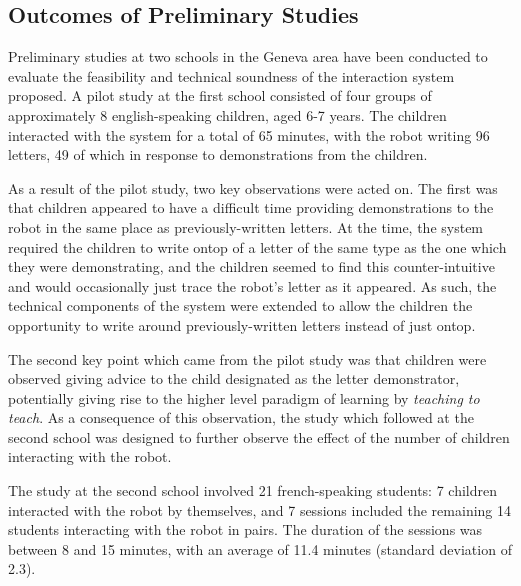 \documentclass{sig-alternate}
\begin{document}
\subsection{Outcomes of Preliminary Studies}%
%
%

Preliminary studies at two schools in the Geneva area have been conducted to
evaluate the feasibility and technical soundness of the interaction system
proposed. A pilot study at the first school consisted of four groups of
approximately 8 english-speaking children, aged 6-7 years. The children
interacted with the system for a total of 65 minutes, with the robot writing 96
letters, 49 of which in response to demonstrations from the children. 

As a result of the pilot study, two key observations were acted on. The first
was that children appeared to have a difficult time providing demonstrations to
the robot in the same place as previously-written letters. At the time, the
system required the children to write ontop of a letter of the same type as the
one which they were demonstrating, and the children seemed to find this
counter-intuitive and would occasionally just trace the robot's letter as it
appeared. As such, the technical components of the system were extended to allow
the children the opportunity to write around previously-written letters instead
of just ontop. 

The second key point which came from the pilot study was that children were
observed giving advice to the child designated as the letter demonstrator,
potentially giving rise to the higher level paradigm of learning by
\emph{teaching to teach}. As a consequence of this observation, the study which
followed at the second school was designed to further observe the effect of the
number of children interacting with the robot.

The study at the second school involved 21 french-speaking students: 7 children
interacted with the robot by themselves, and 7 sessions included the remaining
14 students interacting with the robot in pairs. The duration of the sessions
was between 8 and 15 minutes, with an average of 11.4 minutes (standard
deviation of 2.3). %
%
%
\end{document}
